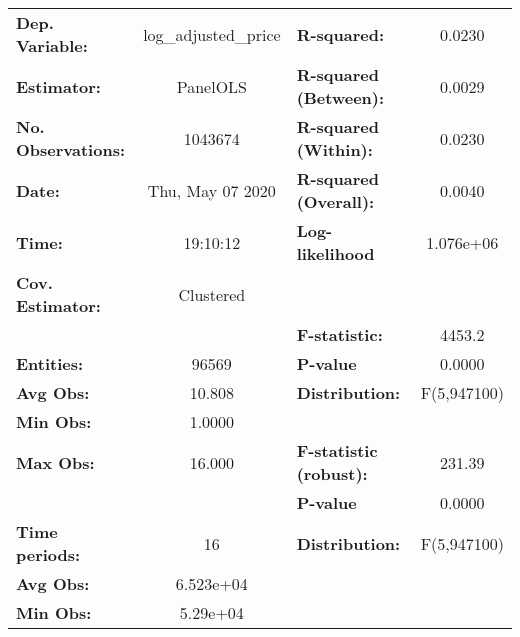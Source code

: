 \documentclass{report}
\begin{document}
\begin{center}
\begin{tabular}{lclc}
\toprule
\textbf{Dep. Variable:}                          & log\_adjusted\_price & \textbf{  R-squared:         }   &      0.0230      \\
\textbf{Estimator:}                              &       PanelOLS       & \textbf{  R-squared (Between):}  &      0.0029      \\
\textbf{No. Observations:}                       &       1043674        & \textbf{  R-squared (Within):}   &      0.0230      \\
\textbf{Date:}                                   &   Thu, May 07 2020   & \textbf{  R-squared (Overall):}  &      0.0040      \\
\textbf{Time:}                                   &       19:10:12       & \textbf{  Log-likelihood     }   &    1.076e+06     \\
\textbf{Cov. Estimator:}                         &      Clustered       & \textbf{                     }   &                  \\
\textbf{}                                        &                      & \textbf{  F-statistic:       }   &      4453.2      \\
\textbf{Entities:}                               &        96569         & \textbf{  P-value            }   &      0.0000      \\
\textbf{Avg Obs:}                                &        10.808        & \textbf{  Distribution:      }   &   F(5,947100)    \\
\textbf{Min Obs:}                                &        1.0000        & \textbf{                     }   &                  \\
\textbf{Max Obs:}                                &        16.000        & \textbf{  F-statistic (robust):} &      231.39      \\
\textbf{}                                        &                      & \textbf{  P-value            }   &      0.0000      \\
\textbf{Time periods:}                           &          16          & \textbf{  Distribution:      }   &   F(5,947100)    \\
\textbf{Avg Obs:}                                &      6.523e+04       & \textbf{                     }   &                  \\
\textbf{Min Obs:}                                &       5.29e+04       & \textbf{                     }   &                  \\

\end{tabular}
\end{center}
\end{document}
